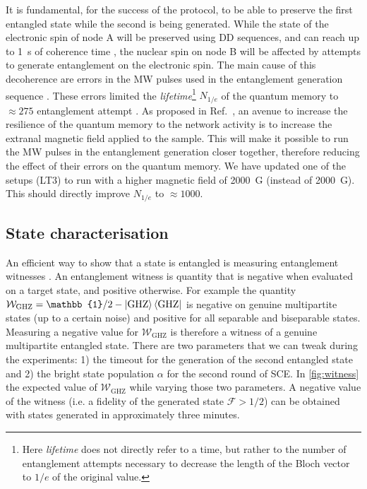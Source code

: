 \documentclass[a4paper, twoside]{article}
\begin{document}
It is fundamental, for the success of the protocol, to be able to preserve the first entangled state while the second is being generated. While the state of the electronic spin of node A will be preserved using \ac{DD} sequences, and can reach up to \SI{1}{s} of coherence time \cite{Abobeih2018}, the nuclear spin on node B will be affected by attempts to generate entanglement on the electronic spin. The main cause of this decoherence are errors in the \ac{MW} pulses used in the entanglement generation sequence \cite{Kalb2018}. These errors limited the \emph{lifetime}\footnote{Here \emph{lifetime} does not directly refer to a time, but rather to the number of entanglement attempts necessary to decrease the length of the Bloch vector to $1/e$ of the original value.} $N_{1/e}$ of the quantum memory to $\approx 275$ entanglement attempt \cite{Kalb2017}. As proposed in Ref.~\cite{Kalb2018}, an avenue to increase the resilience of the quantum memory to the network activity is to increase the extranal magnetic field applied to the sample. This will make it possible to run the \ac{MW} pulses in the entanglement generation closer together, therefore reducing the effect of their errors on the quantum memory. We have updated one of the setups (LT3) to run with a higher magnetic field of \SI{2000}{G} (instead of \SI{2000}{G}). This should directly improve $N_{1/e}$ to $\approx 1000$.

\subsection{State characterisation}

An efficient way to show that a state is entangled is measuring entanglement witnesses \cite{Guehne2009}. An entanglement witness is quantity that is negative when evaluated on a target state, and positive otherwise. For example the quantity $\mathcal W_\text{GHZ} = \mathbb{1}/2 - \ket{\text{GHZ}}\bra{\text{GHZ}}$ is negative on genuine multipartite states (up to a certain noise) and positive for all separable and biseparable states. Measuring a negative value for $\mathcal W_\text{GHZ}$ is therefore a witness of a genuine multipartite entangled state. There are two parameters that we can tweak during the experiments: 1) the timeout for the generation of the second entangled state and 2) the bright state population $\alpha$ for the second round of \ac{SCE}. In \autoref{fig:witness} the expected value of $\mathcal W_\text{GHZ}$ while varying those two parameters. A negative value of the witness (i.e. a fidelity of the generated state $\mathcal{F} > 1/2$) can be obtained with states generated in approximately three minutes.
\end{document}
